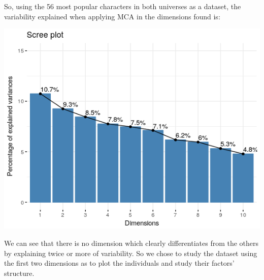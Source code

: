 So, using the 56 most popular characters in both universes as a dataset, the variability explained  when applying MCA in the dimensions found is:
\begin{center}
   \includegraphics[scale=0.5]{img/MCA_scree_plot.png}
\end{center}

We can see that there is no dimension which clearly differentiates from the others by explaining twice or more of variability. So we chose to study the dataset using the first two dimensions as to plot the individuals and study their factors' structure.


